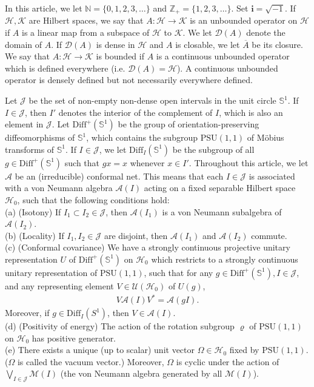 \documentclass[11pt,b5paper,notitlepage]{article}
\theoremstyle{definition}
\theoremstyle{plain}
\newcommand{\mc}{\mathcal}
\newcommand{\ovl}{\overline}
\newcommand{\Dom}{\scr D}
\newcommand{\Diffp}{\mathrm{Diff}^+}
\newcommand{\Diff}{\mathrm{Diff}}
\newcommand{\PSU}{\mathrm{PSU}(1,1)}
\newcommand{\scr}{\mathscr}
\newcommand{\im}{\mathbf{i}}
\newcommand{\mbb}{\mathbb}
\numberwithin{equation}{subsection}
\begin{document}
In this article, we let $\mbb N=\{0,1,2,3,\dots\}$ and $\mbb Z_+=\{1,2,3,\dots\}$. Set $\im=\sqrt{-1}$. If $\mc H,\mc K$ are Hilbert spaces, we say that  $A:\mc H\rightarrow\mc K$ is an unbounded operator on $\mc H$ if $A$ is a linear map from a subspace of $\mc H$ to $\mc K$. We let $\Dom(A)$ denote the domain of $A$. If $\Dom(A)$ is dense in $\mc H$ and $A$ is closable, we let $\ovl A$ be its closure. We say that $A:\mc H\rightarrow\mc K$ is bounded if $A$ is a continuous unbounded operator which is  defined everywhere (i.e. $\Dom(A)=\mc H$). A continuous unbounded operator is densely defined but not necessarily everywhere defined.

Let $\mc J$ be the set of non-empty non-dense open intervals in the unit circle $\mbb S^1$. If $I\in\mc J$, then $I'$ denotes the interior of the complement of $I$, which is also an element in $\mc J$. Let $\Diffp(\mbb S^1)$ be the group of orientation-preserving diffeomorphisms of $\mbb S^1$, which contains the subgroup $\PSU$ of M\"obius transforms of $\mbb S^1$. If $I\in\mc J$, we let $\Diff_I(\mbb S^1)$ be the subgroup of all $g\in\Diffp(\mbb S^1)$ such that $gx=x$ whenever $x\in I'$. Throughout this article, we let $\mc A$ be an (irreducible) conformal net. This means that each $I\in\mathcal J$ is associated with a von Neumann algebra $\mathcal A(I)$ acting on a fixed separable Hilbert space $\mathcal H_0$, such that the following conditions hold:\\
(a) (Isotony) If $I_1\subset I_2\in\mathcal J$, then $\mathcal A(I_1)$ is a von Neumann subalgebra of $\mathcal A(I_2)$.\\
(b) (Locality) If $I_1,I_2\in\mathcal J$ are disjoint, then $\mathcal A(I_1)$ and $\mathcal A(I_2)$ commute.\\
(c) (Conformal covariance) We have a strongly continuous projective unitary representation $U$ of $\Diffp(\mbb S^1)$ on $\mathcal H_0$ which restricts to a strongly continuous unitary representation of $\PSU$, such that for any $g\in \Diffp(\mbb S^1),I\in\mathcal J$, and any representing element $V\in\mathcal U(\mathcal H_0)$ of $U(g)$,
\begin{align*}
V\mathcal A(I)V^*=\mathcal A(gI).
\end{align*}
Moreover, if $g\in\Diff_I(S^1)$, then $V\in\mc A(I)$.\\
(d) (Positivity of energy) The action of the rotation subgroup $\varrho$ of $\PSU$ on $\mc H_0$ has positive generator.\\
(e) There exists a  unique (up to scalar) unit vector $\Omega\in\mathcal H_0$ fixed by $\PSU$. ($\Omega$ is called the vacuum vector.) Moreover, $\Omega$ is  cyclic under the action of $\bigvee_{I\in\mathcal J}\mathcal M(I)$ (the von Neumann algebra generated by all $\mathcal M(I)$).
\end{document}
